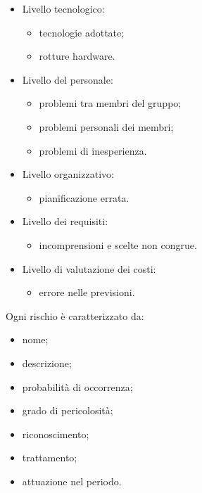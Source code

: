 \begin{itemize}
	\item Livello tecnologico:
	\begin{itemize}
		\item tecnologie adottate;
		\item rotture hardware.
	\end{itemize}
	\item Livello del personale:
	\begin{itemize}
		\item problemi tra membri del gruppo;
		\item problemi personali dei membri;
		\item problemi di inesperienza.
	\end{itemize}
	\item Livello organizzativo:
	\begin{itemize}
		\item pianificazione errata.
	\end{itemize}
	\item Livello dei requisiti:
	\begin{itemize}
		\item incomprensioni e scelte non congrue.
	\end{itemize}
	\item Livello di valutazione dei costi:
	\begin{itemize}
		\item errore nelle previsioni.
	\end{itemize}
\end{itemize}
Ogni rischio è caratterizzato da:
\begin{itemize}
	\item nome;
	\item descrizione;
	\item probabilità di occorrenza;
	\item grado di pericolosità;
	\item riconoscimento;
	\item trattamento;
	\item attuazione nel periodo.
\end{itemize}

